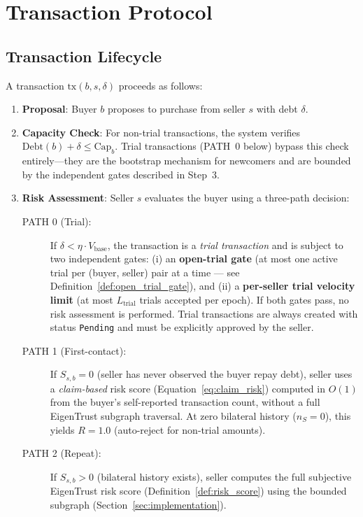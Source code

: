 \documentclass[11pt]{article}
\begin{document}
\section{Transaction Protocol}
\label{sec:protocol}

\subsection{Transaction Lifecycle}

A transaction $\text{tx}(b, s, \delta)$ proceeds as follows:

\begin{enumerate}
    \item \textbf{Proposal}: Buyer $b$ proposes to purchase from seller $s$ with debt $\delta$.
    \item \textbf{Capacity Check}: For non-trial transactions, the system verifies $\text{Debt}(b) + \delta \leq \text{Cap}_b$. Trial transactions (PATH~0 below) bypass this check entirely---they are the bootstrap mechanism for newcomers and are bounded by the independent gates described in Step~3.
    \item \textbf{Risk Assessment}: Seller $s$ evaluates the buyer using a three-path decision:
    \begin{description}
        \item[PATH 0 (Trial):] If $\delta < \eta \cdot V_{\text{base}}$, the transaction is a \emph{trial transaction} and is subject to two independent gates: (i) an \textbf{open-trial gate} (at most one active trial per (buyer, seller) pair at a time --- see Definition~\ref{def:open_trial_gate}), and (ii) a \textbf{per-seller trial velocity limit} (at most $L_{\text{trial}}$ trials accepted per epoch). If both gates pass, no risk assessment is performed. Trial transactions are always created with status \texttt{Pending} and must be explicitly approved by the seller.
        \item[PATH 1 (First-contact):] If $S_{s,b} = 0$ (seller has never observed the buyer repay debt), seller uses a \emph{claim-based} risk score (Equation~\ref{eq:claim_risk}) computed in $O(1)$ from the buyer's self-reported transaction count, without a full EigenTrust subgraph traversal. At zero bilateral history ($n_S = 0$), this yields $R = 1.0$ (auto-reject for non-trial amounts).
        \item[PATH 2 (Repeat):] If $S_{s,b} > 0$ (bilateral history exists), seller computes the full subjective EigenTrust risk score (Definition~\ref{def:risk_score}) using the bounded subgraph (Section~\ref{sec:implementation}).

\end{description}
\end{enumerate}
\end{document}
